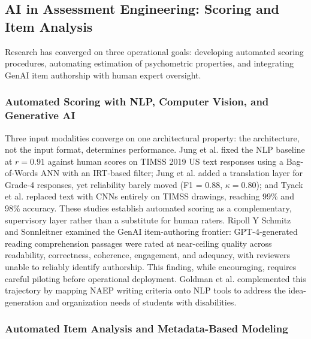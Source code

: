 \documentclass{ieeeaccess}
\begin{document}
\subsection{AI in Assessment Engineering: Scoring and Item Analysis}\label{subsec4.4}

Research has converged on three operational goals: developing automated scoring procedures, automating estimation of psychometric properties, and integrating GenAI item authorship with human expert oversight.

\subsubsection{Automated Scoring with NLP, Computer Vision, and Generative AI}\label{subsubsec4.4.1}

Three input modalities converge on one architectural property: the architecture, not the input format, determines performance. Jung et al. \cite{jung-etal2022} fixed the NLP baseline at $r = 0.91$ against human scores on TIMSS 2019 US text responses using a Bag-of-Words ANN with an IRT-based filter; Jung et al. \cite{jung-etal2024} added a translation layer for Grade-4 responses, yet reliability barely moved (F1 = 0.88, $\kappa = 0.80$); and Tyack et al. \cite{tyack-etal2024} replaced text with CNNs entirely on TIMSS drawings, reaching 99\% and 98\% accuracy. These studies establish automated scoring as a complementary, supervisory layer rather than a substitute for human raters. Ripoll Y Schmitz and Sonnleitner \cite{ripollyschmitz-etal2025} examined the GenAI item-authoring frontier: GPT-4-generated reading comprehension passages were rated at near-ceiling quality across readability, correctness, coherence, engagement, and adequacy, with reviewers unable to reliably identify authorship. This finding, while encouraging, requires careful piloting before operational deployment. Goldman et al. \cite{goldman-etal2025} complemented this trajectory by mapping NAEP writing criteria onto NLP tools to address the idea-generation and organization needs of students with disabilities.

\subsubsection{Automated Item Analysis and Metadata-Based Modeling}\label{subsubsec4.4.2}
\end{document}
